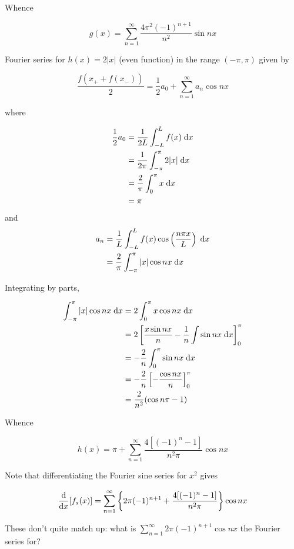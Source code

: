 \documentclass[a4paper]{article}
\begin{document}
Whence 

\[ g(x) = \sum_{n=1}^{\infty} \frac{ 4 \pi^{2} (-1)^{n+1}}{n^{2}} \sin  n x  \]


Fourier series for $ h(x) = 2| x | $ (even function) in the range $ (-\pi,\pi) $ given by


\[ \frac{f(x_{+} + f(x_{-}))}{2} =  \frac{1}{2} a_{0} +  \sum_{n=1}^{\infty} a_{n} \cos  n x   \]


where 

\begin{align*}
\frac{1}{2} a_{0} & = \frac{1}{2L} \int_{-L}^{L} f(x) \; \mathrm{d} x \\
& = \frac{1}{2\pi} \int_{-\pi}^{\pi} 2| x | \; \mathrm{d} x \\
& = \frac{2}{\pi} \int_{0}^{\pi} x \; \mathrm{d} x \\
& = \pi
\end{align*}
and 
\begin{align*}
a_{n} & = \frac{1}{L} \int_{-L}^{L} f(x) \cos \left( \frac{n \pi x}{L} \right) \; \mathrm{d} x  \\
& = \frac{2}{\pi} \int_{-\pi}^{\pi} | x | \cos n x \; \mathrm{d} x
\end{align*}





Integrating by parts,

\begin{align*}
\int_{-\pi}^{\pi} | x | \cos n x \; \mathrm{d} x & = 2 \int_{0}^{\pi} x  \cos n x \; \mathrm{d} x \\
& = 2 \left[ \frac{x \sin n x}{n} - \frac{1}{n} \int \sin n x \; \mathrm{d} x \right]_{0}^{\pi}  \\
& = - \frac{2}{n} \int_{0}^{\pi} \sin n x \; \mathrm{d} x \\
& = - \frac{2}{n} \left[ - \frac{\cos n x}{n} \right]_{0}^{\pi}\\
& = \frac{2}{n^{2}} (\cos n \pi - 1) 
\end{align*}

Whence

\[ h(x) = \pi +  \sum_{n=1}^{\infty} \frac{4[(-1)^{n} - 1]}{n^{2} \pi }  \cos  n x \]

Note that differentiating the Fourier sine series for $ x^{2} $ gives

\[ \frac{\mathrm{d} }{\mathrm{d} x} [ f_{s}(x) ] = \sum_{n=1}^{\infty} \left\{ 2 
\pi (-1)^{n+1} + \frac{4[(-1)^{n} - 1]}{n^{2} \pi }   \right\} \cos  n x   \]

These don't quite match up: what is $ \sum_{n=1}^{\infty}  2 
\pi (-1)^{n+1} \cos n x  $ the Fourier series for?
\end{document}
